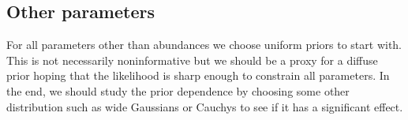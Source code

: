 \documentclass[a4,12pt]{article}
\begin{document}
\subsection{Other parameters}

For all parameters other than abundances we choose uniform priors to
start with. This is not necessarily noninformative but we should be a
proxy for a diffuse prior hoping that the likelihood is sharp enough
to constrain all parameters. In the end, we should study the prior
dependence by choosing some other distribution such as wide Gaussians
or Cauchys to see if it has a significant effect.


\end{document}
